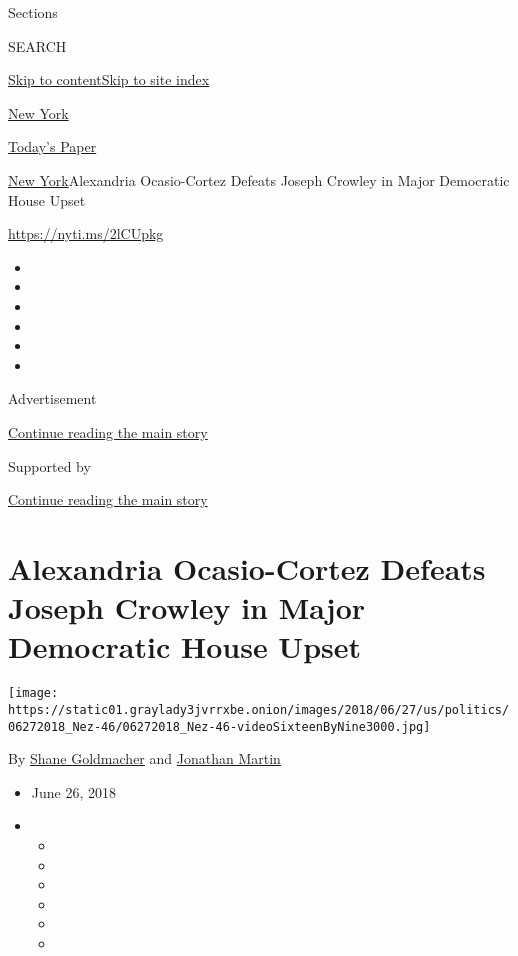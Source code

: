 Sections

SEARCH

\protect\hyperlink{site-content}{Skip to
content}\protect\hyperlink{site-index}{Skip to site index}

\href{https://www.nytimes3xbfgragh.onion/section/nyregion}{New York}

\href{https://myaccount.nytimes3xbfgragh.onion/auth/login?response_type=cookie\&client_id=vi}{}

\href{https://www.nytimes3xbfgragh.onion/section/todayspaper}{Today's
Paper}

\href{/section/nyregion}{New York}\textbar{}Alexandria Ocasio-Cortez
Defeats Joseph Crowley in Major Democratic House Upset

\url{https://nyti.ms/2lCUpkg}

\begin{itemize}
\item
\item
\item
\item
\item
\item
\end{itemize}

Advertisement

\protect\hyperlink{after-top}{Continue reading the main story}

Supported by

\protect\hyperlink{after-sponsor}{Continue reading the main story}

\hypertarget{alexandria-ocasio-cortez-defeats-joseph-crowley-in-major-democratic-house-upset}{%
\section{Alexandria Ocasio-Cortez Defeats Joseph Crowley in Major
Democratic House
Upset}\label{alexandria-ocasio-cortez-defeats-joseph-crowley-in-major-democratic-house-upset}}

\texttt{[image: https://static01.graylady3jvrrxbe.onion/images/2018/06/27/us/politics/06272018\_Nez-46/06272018\_Nez-46-videoSixteenByNine3000.jpg]}

By \href{https://www.nytimes3xbfgragh.onion/by/shane-goldmacher}{Shane
Goldmacher} and
\href{https://www.nytimes3xbfgragh.onion/by/jonathan-martin}{Jonathan
Martin}

\begin{itemize}
\item
  June 26, 2018
\item
  \begin{itemize}
  \item
  \item
  \item
  \item
  \item
  \item
  \end{itemize}
\end{itemize}

